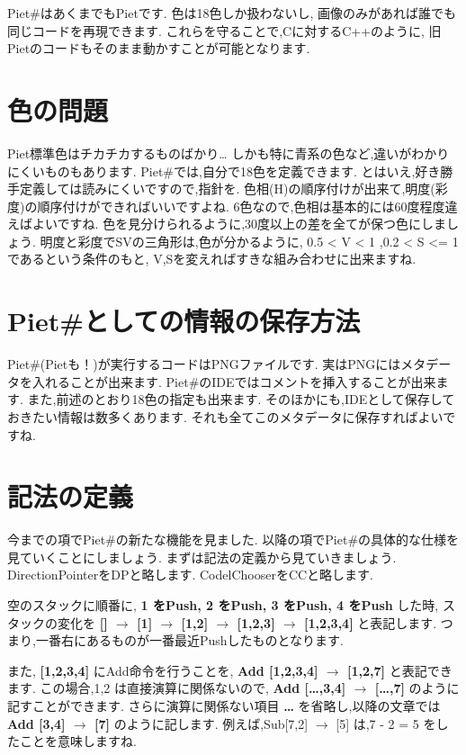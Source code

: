 Piet\#はあくまでもPietです. 色は18色しか扱わないし,
画像のみがあれば誰でも同じコードを再現できます.
これらを守ることで,Cに対するC++のように,
旧Pietのコードもそのまま動かすことが可能となります.

\section{色の問題}

Piet標準色はチカチカするものばかり\ldots{}
しかも特に青系の色など,違いがわかりにくいものもあります.
Piet\#では,自分で18色を定義できます.
とはいえ,好き勝手定義しては読みにくいですので,指針を.
色相(H)の順序付けが出来て,明度(彩度)の順序付けができればいいですよね.
6色なので,色相は基本的には60度程度違えばよいですね.
色を見分けられるように,30度以上の差を全てが保つ色にしましょう.
明度と彩度でSVの三角形は,色が分かるように, 0.5 \textless{} V \textless{}
1 ,0.2 \textless{} S \textless{}= 1であるという条件のもと,
V,Sを変えればすきな組み合わせに出来ますね.

\section{Piet\#としての情報の保存方法}

Piet\#(Pietも！)が実行するコードはPNGファイルです.
実はPNGにはメタデータを入れることが出来ます.
Piet\#のIDEではコメントを挿入することが出来ます.
また,前述のとおり18色の指定も出来ます.
そのほかにも,IDEとして保存しておきたい情報は数多くあります.
それも全てこのメタデータに保存すればよいですね.

\section{記法の定義}

今までの項でPiet\#の新たな機能を見ました.
以降の項でPiet\#の具体的な仕様を見ていくことにしましょう.
まずは記法の定義から見ていきましょう. DirectionPointerをDPと略します.
CodelChooserをCCと略します.

空のスタックに順番に, \textbf{1 をPush, 2 をPush, 3 をPush, 4 をPush}
した時, スタックの変化を \textbf{{[}{]} $\to$ {[}1{]}
$\to$ {[}1,2{]} $\to$ {[}1,2,3{]} $\to$
{[}1,2,3,4{]}} と表記します.
つまり,一番右にあるものが一番最近Pushしたものとなります.

また, \textbf{{[}1,2,3,4{]}} にAdd命令を行うことを, \textbf{Add
{[}1,2,3,4{]} $\to$ {[}1,2,7{]}} と表記できます. この場合,1,2
は直接演算に関係ないので, \textbf{Add {[}\ldots{},3,4{]} $\to$
{[}\ldots{},7{]}} のように記すことができます. さらに演算に関係ない項目
\textbf{\ldots{}} を省略し,以降の文章では \textbf{Add {[}3,4{]}
$\to$ {[}7{]}} のように記します. 例えば,Sub{[}7,2{]}
$\to$ {[}5{]} は,7 - 2 = 5 をしたことを意味しますね.

